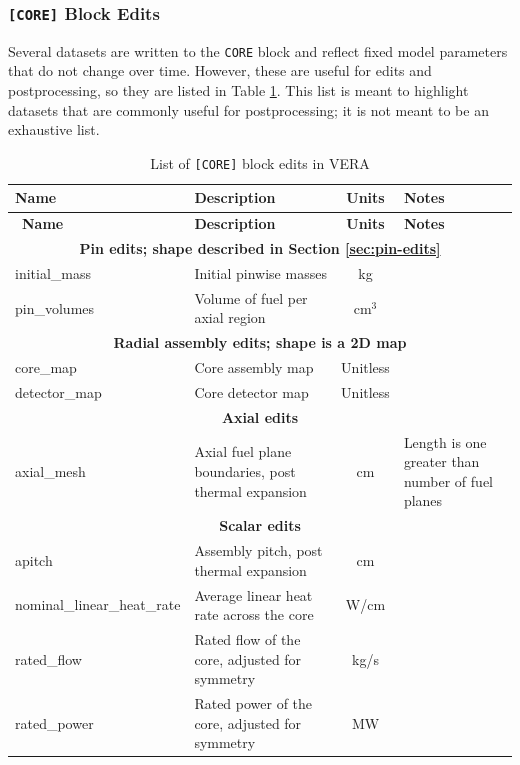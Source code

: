 \subsubsection{\texttt{[CORE]} Block Edits}

Several datasets are written to the \texttt{CORE} block and reflect fixed model parameters that do not change over time.  However, these are useful for edits and postprocessing, so they are listed in Table \ref{tab:default-core-edits}.  This list is meant to highlight datasets that are commonly useful for postprocessing; it is not meant to be an exhaustive list.

\begin{longtable}[h]{|l|p{}|c|p{}|}
    \caption{List of \texttt{[CORE]} block edits in VERA}
    \label{tab:default-core-edits}
    \\

    \hline
    \endfirsthead
    \hline
    {\bf Name} & {\bf Description} & {\bf Units} & {\bf Notes} \\
    \hline
    \endhead
    \hline
    \endfoot
    \hline
    \endlastfoot
    \hline
    \
    {\bf Name} & {\bf Description} & {\bf Units} & {\bf Notes} \\\hline
    \multicolumn{4}{|c|}{\textbf{Pin edits; shape described in Section \ref{sec:pin-edits}}} \\\hline
    initial\_mass & Initial pinwise masses & kg &  \\\hline
    pin\_volumes & Volume of fuel per axial region & cm$^3$ &  \\\hline
    \multicolumn{4}{|c|}{\textbf{Radial assembly edits; shape is a 2D map}} \\\hline
    core\_map & Core assembly map & Unitless &  \\\hline
    detector\_map & Core detector map & Unitless &  \\\hline
    \multicolumn{4}{|c|}{\textbf{Axial edits}} \\\hline
    axial\_mesh & Axial fuel plane boundaries, post thermal expansion & cm & Length is one greater than number of fuel planes \\\hline
    \multicolumn{4}{|c|}{\textbf{Scalar edits}} \\\hline
    apitch & Assembly pitch, post thermal expansion & cm &  \\\hline
    nominal\_linear\_heat\_rate & Average linear heat rate across the core & W/cm &  \\\hline
    rated\_flow & Rated flow of the core, adjusted for symmetry & kg/s &  \\\hline
    rated\_power & Rated power of the core, adjusted for symmetry & MW &  \\\hline
\end{longtable}

